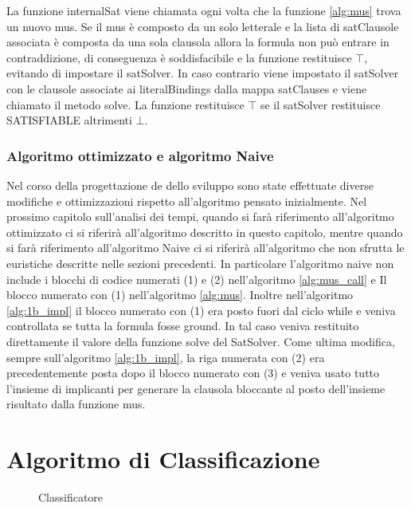 \documentclass[./main.tex]{subfiles}
\begin{document}
La funzione internalSat viene chiamata ogni volta che la funzione \ref{alg:mus}
trova un nuovo mus. 
Se il mus è composto da un solo letterale e la lista di satClausole associata è composta 
da una sola clausola allora la formula non può entrare in contraddizione, di conseguenza 
è soddisfacibile e la funzione restituisce $\top$, evitando di impostare il satSolver.
In caso contrario viene impostato il satSolver con le clausole associate
ai literalBindings dalla mappa satClauses e viene chiamato il metodo solve.
La funzione restituisce $\top$ se il satSolver restituisce SATISFIABLE altrimenti $\bot$.

\subsubsection{Algoritmo ottimizzato e algoritmo Naive}

Nel corso della progettazione de dello sviluppo sono state effettuate diverse modifiche e ottimizzazioni 
rispetto all'algoritmo pensato inizialmente.
Nel prossimo capitolo sull'analisi dei tempi, quando si farà riferimento all'algoritmo ottimizzato ci si riferirà 
all'algoritmo descritto in questo capitolo, mentre quando si farà riferimento all'algoritmo Naive ci si riferirà all'algoritmo
che non sfrutta le euristiche descritte nelle sezioni precedenti.
In particolare l'algoritmo naive non include i blocchi di codice numerati (1) e (2) nell'algoritmo \ref{alg:mus_call} e
Il blocco numerato con (1) nell'algoritmo \ref{alg:mus}.
Inoltre nell'algoritmo \ref{alg:1b_impl} il blocco numerato con (1) era posto 
fuori dal ciclo while e veniva controllata se tutta la formula fosse ground.
In tal caso veniva restituito direttamente il valore della funzione solve del SatSolver.
Come ultima modifica, sempre sull'algoritmo \ref{alg:1b_impl},
la riga numerata con (2) era precedentemente posta dopo il blocco numerato con (3)
e veniva usato tutto l'insieme di implicanti per generare la clausola bloccante
al posto dell'insieme risultato dalla funzione mus. 






\section{Algoritmo di Classificazione}  \label{sec:classifier}

\begin{figure}[H]
    \centering
    \scalebox{0.55}{
        
    }
    \caption{Classificatore}
    \label{fig:classifier}
\end{figure}
\end{document}
